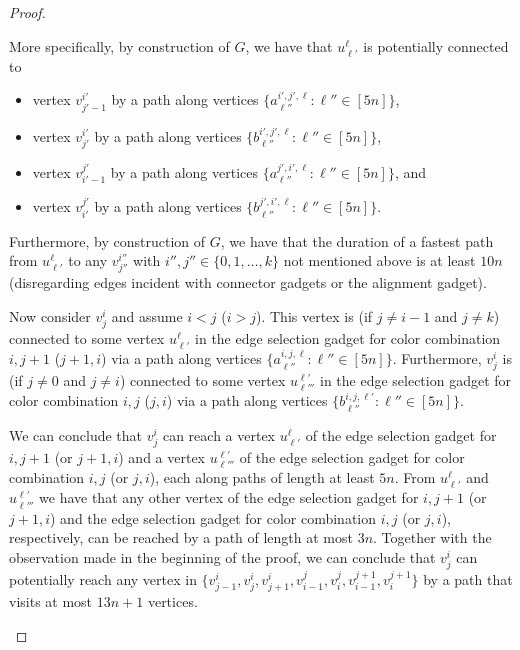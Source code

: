 \documentclass[a4paper,UKenglish,cleveref, autoref, thm-restate, anonymous]{lipics-v2021}
\begin{document}
\begin{proof}
\begin{claimproof}
    More specifically, by construction of $G$, we have that $u^\ell_{\ell'}$ is potentially connected to 
    \begin{itemize}
        \item vertex $v^{i'}_{j'-1}$ by a path along vertices $\{a^{i',j',\ell}_{\ell''} :  \ell''\in[5n]\}$,
        \item vertex $v^{i'}_{j'}$ by a path along vertices $\{b^{i',j',\ell}_{\ell''} :  \ell''\in[5n]\}$, 
        \item vertex $v^{j'}_{i'-1}$ by a path along vertices $\{a^{j',i',\ell}_{\ell''} :  \ell''\in[5n]\}$, and
        \item vertex $v^{j'}_{i'}$ by a path along vertices $\{b^{j',i',\ell}_{\ell''} :  \ell''\in[5n]\}$.
    \end{itemize}
    Furthermore, by construction of $G$, we have that the duration of a fastest path from $u^\ell_{\ell'}$ to any $v^{i''}_{j''}$ with $i'',j''\in\{0,1,\ldots,k\}$ not mentioned above is at least $10n$ (disregarding edges incident with connector gadgets or the alignment gadget).

    Now consider $v^i_j$ and assume $i<j$ ($i>j$). This vertex is (if $j\neq i-1$ and $j\neq k$) connected to some vertex $u^\ell_{\ell'}$ in the edge selection gadget for color combination $i,j+1$ ($j+1,i$) via a path along vertices $\{a^{i,j,\ell}_{\ell''} :  \ell''\in[5n]\}$. Furthermore, $v^i_j$ is (if $j\neq 0$ and $j\neq i$) connected to some vertex $u^{\ell'}_{\ell'''}$ in the edge selection gadget for color combination $i,j$ ($j,i$) via a path along vertices $\{b^{i,j,\ell'}_{\ell''} :  \ell''\in[5n]\}$.

    We can conclude that $v^i_j$ can reach a vertex $u^\ell_{\ell'}$ of the edge selection gadget for $i,j+1$ (or $j+1,i$) and a vertex $u^{\ell'}_{\ell'''}$ of the edge selection gadget for color combination $i,j$ (or $j,i$), each along paths of length at least $5n$. From $u^\ell_{\ell'}$ and $u^{\ell'}_{\ell'''}$ we have that any other vertex of the edge selection gadget for $i,j+1$ (or $j+1,i$) and the edge selection gadget for color combination $i,j$ (or $j,i$), respectively, can be reached by a path of length at most $3n$. Together with the observation made in the beginning of the proof, we can conclude that $v^i_j$ can potentially reach any vertex in $\{v^i_{j-1},v^i_j,v^i_{j+1},v^j_{i-1},v^j_i,v^{j+1}_{i-1},v^{j+1}_i\}$ by a path that visits at most $13n+1$ vertices. 
    

\end{claimproof}
\end{proof}
\end{document}
